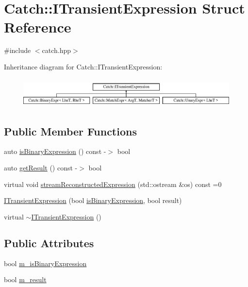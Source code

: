 \hypertarget{struct_catch_1_1_i_transient_expression}{}\section{Catch\+:\+:I\+Transient\+Expression Struct Reference}
\label{struct_catch_1_1_i_transient_expression}


{\ttfamily \#include $<$catch.\+hpp$>$}

Inheritance diagram for Catch\+:\+:I\+Transient\+Expression\+:\begin{figure}[H]
\begin{center}
\leavevmode
\includegraphics[height=1.588652cm]{struct_catch_1_1_i_transient_expression}
\end{center}
\end{figure}
\subsection*{Public Member Functions}
\begin{DoxyCompactItemize}
\item 
auto \mbox{\hyperlink{struct_catch_1_1_i_transient_expression_a3b436e13a0a6d3522bbf70d4e31deb22}{is\+Binary\+Expression}} () const -\/$>$ bool
\item 
auto \mbox{\hyperlink{struct_catch_1_1_i_transient_expression_a101c7db86c87eff93a8ff496720e6320}{get\+Result}} () const -\/$>$ bool
\item 
virtual void \mbox{\hyperlink{struct_catch_1_1_i_transient_expression_aabe1889df9c6e639a24afb08d8a0fe9e}{stream\+Reconstructed\+Expression}} (std\+::ostream \&os) const =0
\item 
\mbox{\hyperlink{struct_catch_1_1_i_transient_expression_aafe69572b7ed884e63ec81f58d4afd8c}{I\+Transient\+Expression}} (bool \mbox{\hyperlink{struct_catch_1_1_i_transient_expression_a3b436e13a0a6d3522bbf70d4e31deb22}{is\+Binary\+Expression}}, bool result)
\item 
virtual \mbox{\hyperlink{struct_catch_1_1_i_transient_expression_aeadf426de589938c4964fe4068eeee77}{$\sim$\+I\+Transient\+Expression}} ()
\end{DoxyCompactItemize}
\subsection*{Public Attributes}
\begin{DoxyCompactItemize}
\item 
bool \mbox{\hyperlink{struct_catch_1_1_i_transient_expression_a75ce48da824d514d08152d396abb28d8}{m\+\_\+is\+Binary\+Expression}}
\item 
bool \mbox{\hyperlink{struct_catch_1_1_i_transient_expression_a4646e2b5e0156e913653ec3b9b60c942}{m\+\_\+result}}
\end{DoxyCompactItemize}


